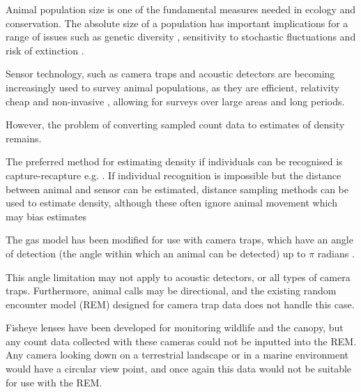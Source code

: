Animal population size is one of the fundamental measures needed in ecology and conservation. The absolute size of a population has important implications for a range of issues such as genetic diversity \citep{o1985genetic, fischer2000genetic, willi2005threefold}, sensitivity to stochastic fluctuations \citep{richter1972extinction,wright1983stochastic} and risk of extinction \citep{purvis2000predicting}.

Sensor technology, such as camera traps \citep{rowcliffe2008surveys,ahumada2011community} and acoustic detectors \citep{ofarrel1999comparison,mellinger2007fixed,jones2011indicator} are becoming increasingly used to survey animal populations, as they are efficient, relativity cheap and non-invasive \citep{gese2001monitoring, o2003crouching, silveira2003camera}, allowing for surveys over large areas and long periods. 


However, the problem of converting sampled count data to estimates of density remains. 


The preferred method for estimating density if individuals can be recognised is capture-recapture e.g. \citep{karanth1995, trolle2003estimation, soisalo2006estimating, trolle2007camera}. If individual recognition is impossible but the distance between animal and sensor can be estimated, distance sampling methods can be used to estimate density, although these often ignore animal movement which may bias estimates \citep{barlow2005estimates, marques2011estimating}


The gas model has been modified for use with camera traps, which have an angle of detection (the angle within which an animal can be detected)  up to $\pi$ radians \citep{rowcliffe2008estimating}. 

This angle limitation may not apply to acoustic detectors, or all types of camera traps. Furthermore, animal calls may be directional, and the existing random encounter model (REM) designed for camera trap data does not handle this case.

Fisheye lenses have been developed for monitoring wildlife and the canopy, but any count data collected with these cameras could not be inputted into the REM. 
Any camera looking down on a terrestrial landscape or in a marine environment would have a circular view point, and once again this data would not be suitable for use with the REM. 



